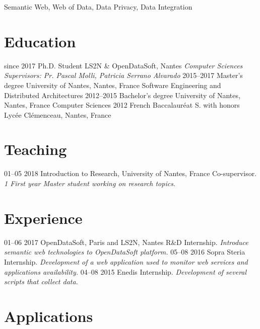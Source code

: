 \documentclass[]{friggeri-cv}
\begin{document}
Semantic Web, Web of Data, Data Privacy, Data Integration

\section{Education}

\begin{entrylist}
  \entry
    {since 2017}
    {Ph.D. Student}
    {LS2N \& OpenDataSoft, Nantes}
    {\emph{Computer Sciences}\\
    \emph{Supervisors: Pr. Pascal Molli, Patricia Serrano Alvarado}}
  \entry
    {2015–2017}
    {Master’s degree}
    {University of Nantes, Nantes, France}
    {Software Engineering and Distributed Architectures}
  \entry
    {2012–2015}
    {Bachelor’s degree}
    {University of Nantes, Nantes, France}
    {Computer Sciences}
  \entry
    {2012}
    {French Baccalauréat S. with honors}
    {Lycée Clémenceau, Nantes, France}
    {}
\end{entrylist}

\section{Teaching}

\begin{entrylist}
  \entry
    {01–05 2018}
    {Introduction to Research, University of Nantes, France}
    {Co-supervisor.}
    {\emph{1 First year Master student working on research topics.}}
 \end{entrylist}

\section{Experience}

\begin{entrylist}
  \entry
    {01–06 2017}
    {OpenDataSoft, Paris and LS2N, Nantes}
    {R\&D Internship.}
    {\emph{Introduce semantic web technologies to OpenDataSoft platform.}}
  \entry
    {05–08 2016}
    {Sopra Steria}
    {Internship.}
    {\emph{Development of a web application used to monitor web services and applications availability.}}
  \entry
    {04–08 2015}
    {Enedis}
    {Internship.}
    {\emph{Development of several scripts that collect data.}}
\end{entrylist}

\section{Applications}
\end{document}
